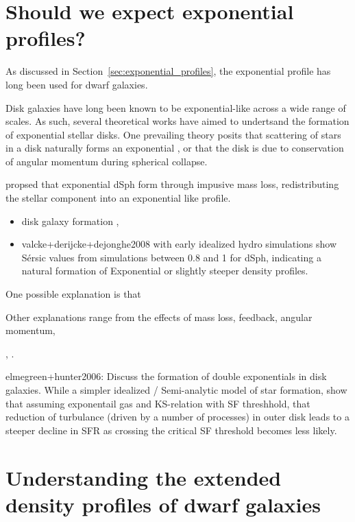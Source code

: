 \section{Should we expect exponential
profiles?}\label{should-we-expect-exponential-profiles}

As discussed in Section~\ref{sec:exponential_profiles}, the exponential
profile has long been used for dwarf galaxies.

Disk galaxies have long been known to be exponential-like across a wide
range of scales. As such, several theoretical works have aimed to
undertsand the formation of exponential stellar disks. One prevailing
theory posits that scattering of stars in a disk naturally forms an
exponential \citep[\citet{wu+2022}]{elmegreen+struck2013}, or that the
disk is due to conservation of angular momentum during spherical
collapse.

\citet{read+gilmore2005} propsed that exponential dSph form through
impusive mass loss, redistributing the stellar component into an
exponential like profile.

\begin{itemize}
\tightlist
\item
  disk galaxy formation \citet{fall+efstathiou1980}, \citet{mestel1963}
\item
  valcke+derijcke+dejonghe2008 with early idealized hydro simulations
  show Sérsic values from simulations between 0.8 and 1 for dSph,
  indicating a natural formation of Exponential or slightly steeper
  density profiles.
\end{itemize}

One possible explanation is that \citet{mayer+2001a}

Other explanations range from the effects of mass loss, feedback,
angular momentum,

\citet{klimentowski+2007}, \citet{klimentowski+2009}.

elmegreen+hunter2006: Discuss the formation of double exponentials in
disk galaxies. While a simpler idealized / Semi-analytic model of star
formation, show that assuming exponentail gas and KS-relation with SF
threshhold, that reduction of turbulance (driven by a number of
processes) in outer disk leads to a steeper decline in SFR as crossing
the critical SF threshold becomes less likely.

\section{Understanding the extended density profiles of dwarf
galaxies}\label{understanding-the-extended-density-profiles-of-dwarf-galaxies}

